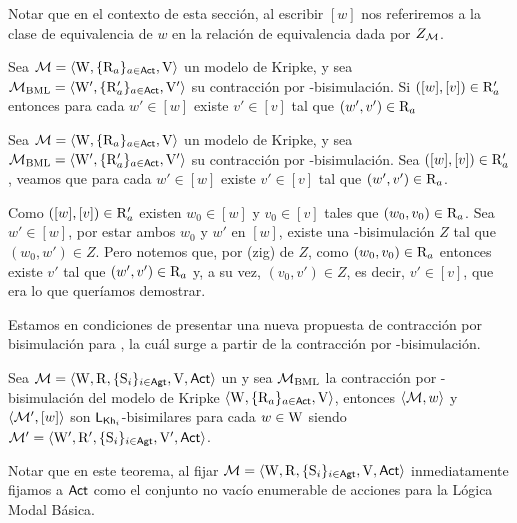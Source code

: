 Notar que en el contexto de esta sección, al escribir $[w]$ nos referiremos a la clase de equivalencia de $w$ en la relación de 
equivalencia dada por $Z_{\mathcal{M}}$.

\begin{lema}\label{lema:bml-R-lema}
    Sea $\mathcal{M} = \langle \mathrm{W},\{\mathrm{R}_a\}_{a\in{\rm \sf Act}},\mathrm{V} \rangle$ un modelo de Kripke, y sea $\mathcal{M}_{\mathrm{BML}} = \langle \mathrm{W}',\{\mathrm{R}_a'\}_{a\in{\rm \sf Act}},\mathrm{V}' \rangle$ su contracción por \bml-bisimulación.
    Si $([w],[v]) \in \mathrm{R}'_a$ entonces para cada $w' \in [w]$ existe $v' \in [v]$ tal que $(w',v') \in \mathrm{R}_a$
\end{lema}

\begin{demostracion}
    Sea $\mathcal{M} = \langle \mathrm{W},\{\mathrm{R}_a\}_{a\in{\rm \sf Act}},\mathrm{V} \rangle$ un modelo de Kripke, y sea $\mathcal{M}_{\mathrm{BML}} = \langle \mathrm{W}',\{\mathrm{R}_a'\}_{a\in{\rm \sf Act}},\mathrm{V}' \rangle$ su contracción por \bml-bisimulación. Sea $([w],[v]) \in \mathrm{R}'_a$, veamos que para cada $w' \in [w]$ existe $v' \in [v]$ tal que $(w',v') \in \mathrm{R}_a$.

    Como $([w],[v]) \in \mathrm{R}'_a$ existen $w_0 \in [w]$ y $v_0 \in [v]$ tales que $(w_0,v_0)\in \mathrm{R}_a$. Sea $w' \in [w]$, por estar ambos 
    $w_0$ y $w'$ en $[w]$, existe una \bml-bisimulación $Z$ tal que $(w_0,w') \in Z$. Pero notemos que, por (zig) de $Z$, como 
    $(w_0,v_0) \in \mathrm{R}_a$  entonces existe $v'$ tal que $(w',v') \in \mathrm{R}_a$ y, a su vez, 
    $(v_0,v') \in Z$, es decir, $v' \in [v]$, que era lo que queríamos demostrar.
\end{demostracion}

Estamos en condiciones de presentar una nueva propuesta de contracción por bisimulación para \KHilogic, la cuál surge a partir de la 
contracción por \bml-bisimulación.

\begin{teorema}
    Sea $\mathcal{M}=\langle \mathrm{W},\mathrm{R},\{ \mathrm{S}_i \}_{i \in {\rm \sf Agt}},\mathrm{V},{\rm \sf Act} \rangle$ un \ults y sea $\mathcal{M}_{\mathrm{BML}}$ 
    la contracción por \bml-bisimulación del modelo de Kripke $\langle \mathrm{W},\{\mathrm{R}_a\}_{a\in{\rm \sf Act}},\mathrm{V} \rangle$, 
    entonces $\langle \mathcal{M},w \rangle$ y $\langle \mathcal{M}',[w] \rangle$ son $\mathsf{L}_{\mathsf{Kh}_i}$-bisimilares para cada $w \in \mathrm{W}$ 
    siendo $\mathcal{M}' = \langle \mathrm{W}',\mathrm{R}',\{ \mathrm{S}_i \}_{i \in {\rm \sf Agt}},\mathrm{V}',{\rm \sf Act} \rangle$.
\end{teorema}

Notar que en este teorema, al fijar $\mathcal{M}=\langle \mathrm{W},\mathrm{R},\{ \mathrm{S}_i \}_{i \in {\rm \sf Agt}},\mathrm{V},{\rm \sf Act} \rangle$ inmediatamente fijamos a ${\rm \sf Act}$ como el conjunto no vacío enumerable de acciones para la Lógica Modal Básica.

